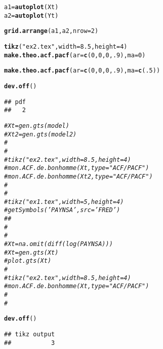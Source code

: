 \documentclass{article}\usepackage[]{graphicx}\usepackage[]{color}
\makeatletter
\newcommand{\hlnum}[1]{\textcolor[rgb]{0.686,0.059,0.569}{#1}}%
\newcommand{\hlstr}[1]{\textcolor[rgb]{0.192,0.494,0.8}{#1}}%
\newcommand{\hlcom}[1]{\textcolor[rgb]{0.678,0.584,0.686}{\textit{#1}}}%
\newcommand{\hlstd}[1]{\textcolor[rgb]{0.345,0.345,0.345}{#1}}%
\newcommand{\hlkwb}[1]{\textcolor[rgb]{0.69,0.353,0.396}{#1}}%
\newcommand{\hlkwc}[1]{\textcolor[rgb]{0.333,0.667,0.333}{#1}}%
\newcommand{\hlkwd}[1]{\textcolor[rgb]{0.737,0.353,0.396}{\textbf{#1}}}%
\newenvironment{kframe}{%
 \def\at@end@of@kframe{}%
 \ifinner\ifhmode%
  \def\at@end@of@kframe{\end{minipage}}%
  \begin{minipage}{\columnwidth}%
 \fi\fi%
 \def\FrameCommand##1{\hskip\@totalleftmargin \hskip-\fboxsep
 \colorbox{shadecolor}{##1}\hskip-\fboxsep
     \hskip-\linewidth \hskip-\@totalleftmargin \hskip\columnwidth}%
 \MakeFramed {\advance\hsize-\width
   \@totalleftmargin\z@ \linewidth\hsize
   \@setminipage}}%
 {\par\unskip\endMakeFramed%
 \at@end@of@kframe}
\newenvironment{knitrout}{}{} %
\makeatother
\begin{document}
\begin{knitrout}
\begin{kframe}
\begin{alltt}
\hlstd{a1} \hlkwb{=} \hlkwd{autoplot}\hlstd{(Xt)}
\hlstd{a2} \hlkwb{=} \hlkwd{autoplot}\hlstd{(Yt)}

\hlkwd{grid.arrange}\hlstd{(a1, a2,} \hlkwc{nrow} \hlstd{=} \hlnum{2}\hlstd{)}


\hlkwd{tikz}\hlstd{(}\hlstr{"ex2.tex"}\hlstd{,} \hlkwc{width} \hlstd{=} \hlnum{8.5}\hlstd{,} \hlkwc{height} \hlstd{=} \hlnum{4}\hlstd{)}
\hlkwd{make.theo.acf.pacf}\hlstd{(}\hlkwc{ar} \hlstd{=} \hlkwd{c}\hlstd{(}\hlnum{0}\hlstd{,} \hlnum{0}\hlstd{,} \hlnum{0}\hlstd{,} \hlnum{.9}\hlstd{),} \hlkwc{ma} \hlstd{=} \hlnum{0}\hlstd{)}
\end{alltt}


{\ttfamily\noindent\color{warningcolor}{\#\# Warning: Removed 1 rows containing missing values (geom\_segment).}}\begin{alltt}
\hlkwd{make.theo.acf.pacf}\hlstd{(}\hlkwc{ar} \hlstd{=} \hlkwd{c}\hlstd{(}\hlnum{0}\hlstd{,} \hlnum{0}\hlstd{,} \hlnum{0}\hlstd{,} \hlnum{.9}\hlstd{),} \hlkwc{ma} \hlstd{=}  \hlkwd{c}\hlstd{(}\hlnum{.5}\hlstd{))}
\end{alltt}


{\ttfamily\noindent\color{warningcolor}{\#\# Warning: Removed 1 rows containing missing values (geom\_segment).}}\begin{alltt}
\hlkwd{dev.off}\hlstd{()}
\end{alltt}
\begin{verbatim}
## pdf 
##   2
\end{verbatim}
\begin{alltt}
\hlcom{# Xt = gen.gts(model)}
\hlcom{# Xt2 = gen.gts(model2)}
\hlcom{# }
\hlcom{# }
\hlcom{# tikz("ex2.tex", width = 8.5, height = 4)}
\hlcom{# mon.ACF.de.bonhomme(Xt, type = "ACF/PACF")}
\hlcom{# mon.ACF.de.bonhomme(Xt2, type = "ACF/PACF")}
\hlcom{# }
\hlcom{# }
\hlcom{# tikz("ex1.tex", width = 5, height = 4)}
\hlcom{# getSymbols('PAYNSA',src='FRED')}
\hlcom{# #}
\hlcom{# }
\hlcom{# }
\hlcom{# Xt = na.omit(diff(log(PAYNSA)))}
\hlcom{# Xt = gen.gts(Xt)}
\hlcom{# plot.gts(Xt)}
\hlcom{# }
\hlcom{# tikz("ex2.tex", width = 8.5, height = 4)}
\hlcom{# mon.ACF.de.bonhomme(Xt, type = "ACF/PACF")}
\hlcom{# }
\hlcom{# }

\hlkwd{dev.off}\hlstd{()}
\end{alltt}
\begin{verbatim}
## tikz output 
##           3
\end{verbatim}
\end{kframe}
\end{knitrout}

\begin{figure}

\end{figure}

\begin{figure}

\end{figure}

% 
\end{document}
